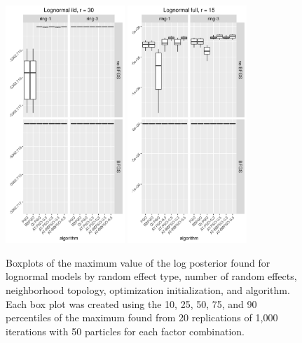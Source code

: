 \documentclass[12pt]{article}
\begin{document}
\begin{figure}[!ht]
\centering
\includegraphics[width=0.4\textwidth]{pop/maxplot22.png}
\includegraphics[width=0.4\textwidth]{pop/maxplot24.png}
\caption{Boxplots of the maximum value of the log posterior found for lognormal models by random effect type, number of random effects, neighborhood topology, optimization initialization, and algorithm. Each box plot was created using the 10, 25, 50, 75, and 90 percentiles of the maximum found from 20 replications of 1,000 iterations with 50 particles for each factor combination.}
\label{fig:popmaxboxplot2}
\end{figure}
\end{document}
